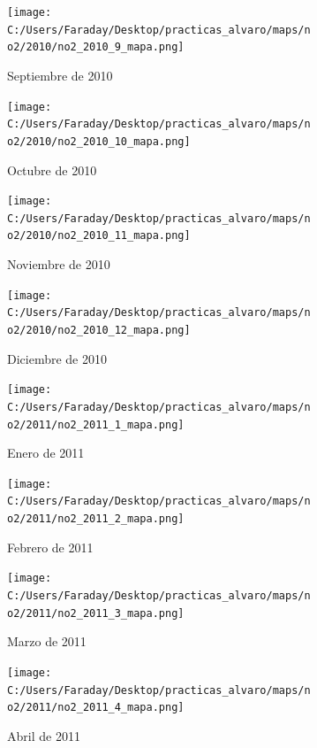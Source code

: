 \documentclass[12pt]{article}
\begin{document}
\begin{figure}[H]
\centering
\begin{subfigure}[h]{0.45\textwidth}
\texttt{[image: C:/Users/Faraday/Desktop/practicas\_alvaro/maps/no2/2010/no2\_2010\_9\_mapa.png]}
\caption{Septiembre de 2010}
\label{fig:map-mon-1-9-2010}
\end{subfigure}
%
\begin{subfigure}[H]{0.45\textwidth}
\texttt{[image: C:/Users/Faraday/Desktop/practicas\_alvaro/maps/no2/2010/no2\_2010\_10\_mapa.png]}
\caption{Octubre de 2010}
\label{fig:map-mon-1-10-2010}
\end{subfigure}
\caption{}
\end{figure}

\newpage

\begin{figure}[H]
\centering
\begin{subfigure}[h]{0.45\textwidth}
\texttt{[image: C:/Users/Faraday/Desktop/practicas\_alvaro/maps/no2/2010/no2\_2010\_11\_mapa.png]}
\caption{Noviembre de 2010}
\label{fig:map-mon-1-11-2010}
\end{subfigure}
%
\begin{subfigure}[H]{0.45\textwidth}
\texttt{[image: C:/Users/Faraday/Desktop/practicas\_alvaro/maps/no2/2010/no2\_2010\_12\_mapa.png]}
\caption{Diciembre de 2010}
\label{fig:map-mon-1-12-2010}
\end{subfigure}
\caption{}
\end{figure}

\begin{figure}[H]
\centering
\begin{subfigure}[h]{0.45\textwidth}
\texttt{[image: C:/Users/Faraday/Desktop/practicas\_alvaro/maps/no2/2011/no2\_2011\_1\_mapa.png]}
\caption{Enero de 2011}
\label{fig:map-mon-1-1-2011}
\end{subfigure}
%
\begin{subfigure}[H]{0.45\textwidth}
\texttt{[image: C:/Users/Faraday/Desktop/practicas\_alvaro/maps/no2/2011/no2\_2011\_2\_mapa.png]}
\caption{Febrero de 2011}
\label{fig:map-mon-1-2-2011}
\end{subfigure}
\caption{}
\end{figure}

\begin{figure}[H]
\centering
\begin{subfigure}[h]{0.45\textwidth}
\texttt{[image: C:/Users/Faraday/Desktop/practicas\_alvaro/maps/no2/2011/no2\_2011\_3\_mapa.png]}
\caption{Marzo de 2011}
\label{fig:map-mon-1-3-2011}
\end{subfigure}
%
\begin{subfigure}[H]{0.45\textwidth}
\texttt{[image: C:/Users/Faraday/Desktop/practicas\_alvaro/maps/no2/2011/no2\_2011\_4\_mapa.png]}
\caption{Abril de 2011}
\label{fig:map-mon-1-4-2011}
\end{subfigure}
\caption{}
\end{figure}
\end{document}
